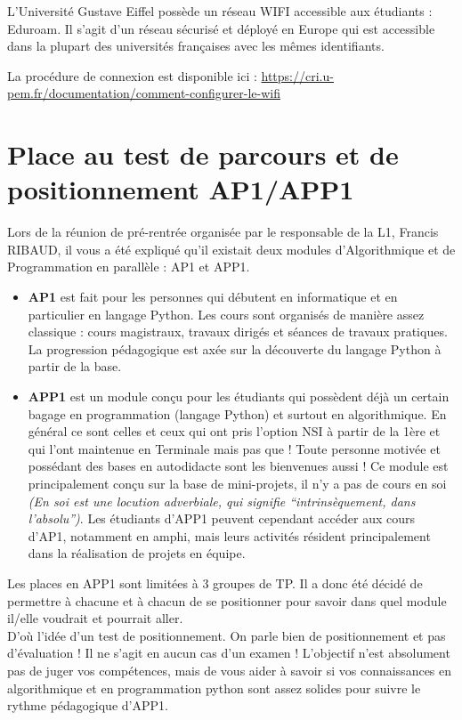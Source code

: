 \documentclass{article}
\begin{document}
L'Université Gustave Eiffel possède un réseau WIFI accessible aux étudiants : Eduroam. Il s'agit d'un réseau sécurisé et déployé en Europe qui est accessible dans la plupart des universités françaises avec les mêmes identifiants. 

La procédure de connexion est disponible ici : \url{https://cri.u-pem.fr/documentation/comment-configurer-le-wifi}

\section {Place au test de parcours et de positionnement AP1/APP1}

Lors de la réunion de pré-rentrée organisée par le responsable de la L1, Francis RIBAUD, il vous a été expliqué qu'il existait deux modules d'Algorithmique et de Programmation en parallèle : AP1 et APP1. 

\begin{itemize}
\item 
\textbf{AP1} est fait pour les personnes qui débutent en informatique et en particulier en langage Python. Les cours sont organisés de manière assez classique : cours magistraux, travaux dirigés et séances de travaux pratiques. La progression pédagogique est axée sur la découverte du langage Python à partir de la base.

\medskip

\item 
\textbf{APP1} est un module con\c cu pour les étudiants qui possèdent déjà un certain bagage en programmation (langage Python) et surtout en algorithmique. En général ce sont celles et ceux qui ont pris l'option NSI à partir de la 1ère et qui l'ont maintenue en Terminale mais pas que ! Toute personne motivée et possédant des bases en autodidacte sont les bienvenues aussi ! Ce module est principalement con\c cu sur la base de mini-projets, il n'y a pas de cours en soi \emph{(En soi est une locution adverbiale, qui signifie ``intrinsèquement, dans l’absolu'')}. Les étudiants d'APP1 peuvent cependant accéder aux cours d'AP1, notamment en amphi, mais leurs activités résident principalement dans la réalisation de projets en équipe.
\end{itemize}

Les places en APP1 sont limitées à 3 groupes de TP. Il a donc été décidé de permettre à chacune et à chacun de se positionner pour savoir dans quel module il/elle voudrait et pourrait aller. \\
D'où l'idée d'un test de positionnement. On parle bien de positionnement et pas d'évaluation ! Il ne s'agit en aucun cas d'un examen ! L'objectif n'est absolument pas de juger vos compétences, mais de vous aider à savoir si vos connaissances en algorithmique et en programmation python sont assez solides pour suivre le rythme pédagogique d'APP1.\\
\end{document}
